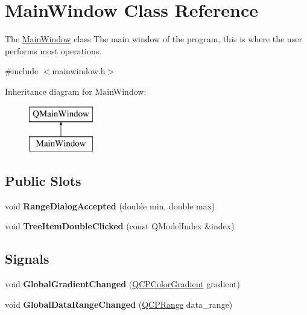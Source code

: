 \hypertarget{class_main_window}{}\section{Main\+Window Class Reference}
\label{class_main_window}


The \hyperlink{class_main_window}{Main\+Window} class The main window of the program, this is where the user performs most operations.  




{\ttfamily \#include $<$mainwindow.\+h$>$}

Inheritance diagram for Main\+Window\+:\begin{figure}[H]
\begin{center}
\leavevmode
\includegraphics[height=2.000000cm]{class_main_window}
\end{center}
\end{figure}
\subsection*{Public Slots}
\begin{DoxyCompactItemize}
\item 
void {\bfseries Range\+Dialog\+Accepted} (double min, double max)\hypertarget{class_main_window_aabdd9af63bada1cef223752691c3d8e0}{}\label{class_main_window_aabdd9af63bada1cef223752691c3d8e0}

\item 
void {\bfseries Tree\+Item\+Double\+Clicked} (const Q\+Model\+Index \&index)\hypertarget{class_main_window_a27d03c648df8df4b89f21d0896fa6946}{}\label{class_main_window_a27d03c648df8df4b89f21d0896fa6946}

\end{DoxyCompactItemize}
\subsection*{Signals}
\begin{DoxyCompactItemize}
\item 
void {\bfseries Global\+Gradient\+Changed} (\hyperlink{class_q_c_p_color_gradient}{Q\+C\+P\+Color\+Gradient} gradient)\hypertarget{class_main_window_ab2c4828c97d36f9dca59d7f0d5314b84}{}\label{class_main_window_ab2c4828c97d36f9dca59d7f0d5314b84}

\item 
void {\bfseries Global\+Data\+Range\+Changed} (\hyperlink{class_q_c_p_range}{Q\+C\+P\+Range} data\+\_\+range)\hypertarget{class_main_window_a6de945a7ef4b0a52998e1662bfb99c0f}{}\label{class_main_window_a6de945a7ef4b0a52998e1662bfb99c0f}

\end{DoxyCompactItemize}
